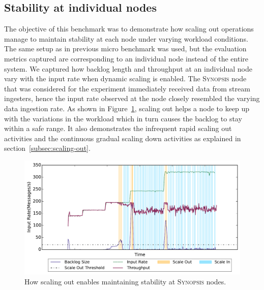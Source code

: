 \subsection{Stability at individual nodes}
The objective of this benchmark was to demonstrate how scaling out operations manage to maintain stability at each node under varying workload conditions.
The same setup as in previous micro benchmark was used, but the evaluation metrics captured are corresponding to an individual node instead of the entire system.
We captured how backlog length and throughput at an individual node vary with the input rate when dynamic scaling is enabled.
The \textsc{Synopsis} node that was considered for the experiment immediately received data from stream ingesters, hence the input rate observed at the node closely resembled the varying data ingestion rate.
As shown in Figure~\ref{fig:stability-backlog}, scaling out helps a node to keep up with the variations in the workload which in turn causes the backlog to stay within a safe range.
It also demonstrates the infrequent rapid scaling out activities and the continuous gradual scaling down activities as explained in section~\ref{subsec:scaling-out}.
\begin{figure}
    \centerline{\includegraphics[width=6in]{figures/stability_partial.pdf}}
    \caption{How scaling out enables maintaining stability at \textsc{Synopsis} nodes.}
    \label{fig:stability-backlog}
\end{figure}

